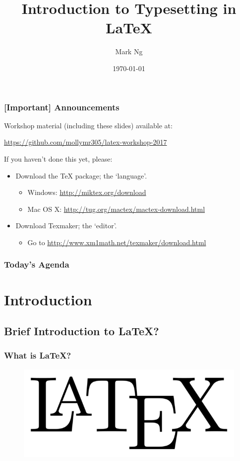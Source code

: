 \documentclass{beamer}
\title[Introduction to Typesetting in \LaTeX{}]{
    Introduction to Typesetting in \LaTeX{}
}
\author{Mark Ng}
\institute[NUS]{
    National University of Singapore\\
    \medskip
    \textit{latexify@nusmathsoc.org}
}
\date{\today}
\begin{document}
    \begin{frame}
        \titlepage
    \end{frame}

    \begin{frame}
        \frametitle{[Important] Announcements}
        Workshop material (including these slides) available at:
        \begin{center}
            \url{https://github.com/mollymr305/latex-workshop-2017}
        \end{center}
        If you haven't done this yet, please:
        \begin{itemize}
            \item Download the \TeX{} package; the `language'.
            \begin{itemize}
                \item Windows: \url{http://miktex.org/download}
                \item Mac OS X: \url{http://tug.org/mactex/mactex-download.html}
            \end{itemize}
            \item Download Texmaker; the `editor'.
            \begin{itemize}
                \item Go to \url{http://www.xm1math.net/texmaker/download.html}
            \end{itemize}
        \end{itemize}
    \end{frame}


    \begin{frame}
        \frametitle{Today's Agenda}
        \tableofcontents
    \end{frame}

    \section{Introduction}
    \subsection{Brief Introduction to \LaTeX{}?}
    \begin{frame}
        \frametitle{What is \LaTeX{}?}
        \begin{figure}[H]
            \includegraphics[scale=0.2]{logo.png}
        \end{figure}
    \end{frame}
\end{document}
